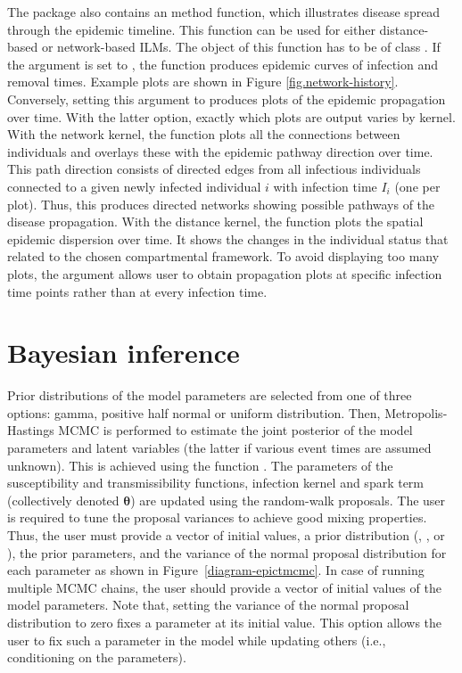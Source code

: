 \documentclass[nojss,shortnames]{jss}
\begin{document}
The package also contains an  method  function, which illustrates disease spread through the epidemic timeline. This function can be used for either distance-based or network-based ILMs. The object of this function has to be of class . If the  argument is set to , the function produces epidemic curves of infection and removal times. Example plots are shown in Figure \ref{fig.network-history}. Conversely, setting this argument to  produces plots of the epidemic propagation over time. With the latter option, exactly which plots are output varies by kernel. With the network kernel, the function plots all the connections between individuals and overlays these with the epidemic pathway direction over time. This path direction consists of directed edges from all infectious individuals connected to a given newly infected individual $i$ with infection time $I_{i}$ (one per plot). Thus, this produces directed networks showing possible pathways of the disease propagation. 
With the distance kernel, the function plots the spatial epidemic dispersion over time. It shows the changes in the individual status that related to the chosen compartmental framework. To avoid displaying too many plots, the  argument allows user to obtain propagation plots at specific infection time points rather than at every infection time. 

\section{Bayesian inference}\label{Bayesian Inference}

Prior distributions of the model parameters are selected from one of three options: gamma, positive half normal or uniform distribution. Then, Metropolis-Hastings MCMC is performed to estimate the joint posterior of the model parameters and latent variables (the latter if various event times are assumed unknown). This is achieved using the function . The parameters of the susceptibility and transmissibility functions, infection kernel and spark term (collectively denoted $\boldsymbol{\theta}$) are updated using the random-walk proposals. The user is required to tune the proposal variances to achieve good mixing properties. Thus, the user must provide a vector of initial values, a prior distribution (, , or ), the prior parameters, and the variance of the normal proposal distribution for each parameter as shown in Figure~\ref{diagram-epictmcmc}. In case of running multiple MCMC chains, the user should provide a vector of initial values of the model parameters. Note that, setting the variance of the normal proposal distribution to zero fixes a parameter at its initial value. This option allows the user to fix such a parameter in the model while updating others (i.e., conditioning on the parameters).
\end{document}
